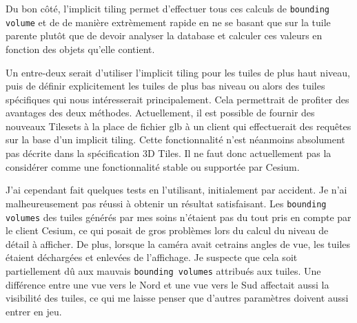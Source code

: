 
Du bon côté, l'implicit tiling permet d'effectuer tous ces calculs de \texttt{bounding volume} et de  de manière extrèmement rapide en ne se basant que sur la tuile parente plutôt que de devoir analyser la database et calculer ces valeurs en fonction des objets qu'elle contient.

Un entre-deux serait d'utiliser l'implicit tiling pour les tuiles de plus haut niveau, puis de définir explicitement les tuiles de plus bas niveau ou alors des tuiles spécifiques qui nous intéresserait principalement. Cela permettrait de profiter des avantages des deux méthodes. Actuellement, il est possible de fournir des nouveaux Tilesets à la place de fichier glb à un client qui effectuerait des requêtes sur la base d'un implicit tiling. Cette fonctionnalité n'est néanmoins absolument pas décrite dans la spécification 3D Tiles. Il ne faut donc actuellement pas la considérer comme une fonctionnalité stable ou supportée par Cesium.

J'ai cependant fait quelques tests en l'utilisant, initialement par accident. Je n'ai malheureusement pas réussi à obtenir un résultat satisfaisant. Les \texttt{bounding volumes} des tuiles générés par mes soins n'étaient pas du tout pris en compte par le client Cesium, ce qui posait de gros problèmes lors du calcul du niveau de détail à afficher. De plus, lorsque la caméra avait cetrains angles de vue, les tuiles étaient déchargées et enlevées de l'affichage. Je suspecte que cela soit partiellement dû aux mauvais \texttt{bounding volumes} attribués aux tuiles. Une différence entre une vue vers le Nord et une vue vers le Sud affectait aussi la visibilité des tuiles, ce qui me laisse penser que d'autres paramètres doivent aussi entrer en jeu.